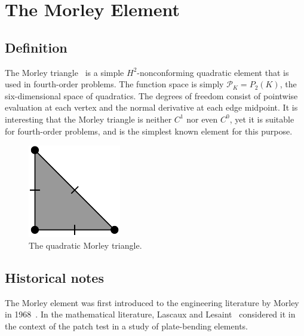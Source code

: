 
\newpage

\section{The Morley Element}

\subsection{Definition}

The Morley triangle~\cite{Morley1968} is a simple \( H^2
\)-nonconforming quadratic element that is used in fourth-order
problems.  The function space is simply \( \mathcal{P}_K = P_2(K) \),
the six-dimensional space of quadratics.  The degrees of freedom
consist of pointwise evaluation at each vertex and the normal
derivative at each edge midpoint. It is interesting that the Morley
triangle is neither \( C^1 \) nor even \( C^0 \), yet it is suitable
for fourth-order problems, and is the simplest known element for this
purpose.

\begin{figure}[h]
  \begin{center}
    \includegraphics[width=\smallfig]{chapters/kirby-6/pdf/MOR2.pdf}
    \caption{The quadratic Morley triangle.}
  \end{center}
\end{figure}

\subsection{Historical notes}

The Morley element was first introduced to the engineering literature
by Morley in 1968~\cite{Morley1968}. In the mathematical literature,
Lascaux and Lesaint~\cite{LascauxLesaint1975} considered it in the
context of the patch test in a study of plate-bending elements.

